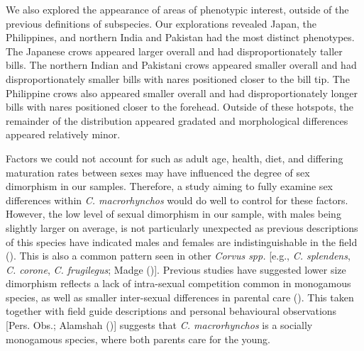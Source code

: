 \documentclass[10pt,a4paper]{article}
\begin{document}
We also explored the appearance of areas of phenotypic interest, outside of the previous definitions of subspecies.
Our explorations revealed Japan, the Philippines, and northern India and Pakistan had the most distinct phenotypes.
The Japanese crows appeared larger overall and had disproportionately taller bills.
The northern Indian and Pakistani crows appeared smaller overall and had disproportionately smaller bills with nares positioned closer to the bill tip.
The Philippine crows also appeared smaller overall and had disproportionately longer bills with nares positioned closer to the forehead.
Outside of these hotspots, the remainder of the distribution appeared gradated and morphological differences appeared relatively minor.

Factors we could not account for such as adult age, health, diet, and differing maturation rates between sexes may have influenced the degree of sex dimorphism in our samples.
Therefore, a study aiming to fully examine sex differences within \emph{C. macrorhynchos} would do well to control for these factors.
However, the low level of sexual dimorphism in our sample, with males being slightly larger on average, is not particularly unexpected as previous descriptions of this species have indicated males and females are indistinguishable in the field ().
This is also a common pattern seen in other \emph{Corvus spp.} {[}e.g., \emph{C. splendens}, \emph{C. corone}, \emph{C. frugilegus}; Madge (){]}.
Previous studies have suggested lower size dimorphism reflects a lack of intra-sexual competition common in monogamous species, as well as smaller inter-sexual differences in parental care ().
This taken together with field guide descriptions and personal behavioural observations {[}Pers. Obs.; Alamshah (){]} suggests that \emph{C. macrorhynchos} is a socially monogamous species, where both parents care for the young.
\end{document}
